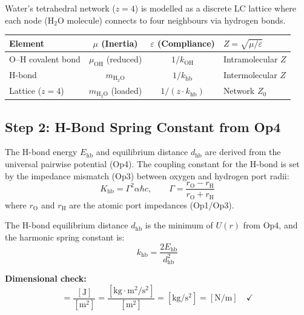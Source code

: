 Water's tetrahedral network ($z = 4$) is modelled as a discrete LC lattice 
where each node (H$_2$O molecule) connects to four neighbours via hydrogen bonds.

\begin{center}
\small
\renewcommand{\arraystretch}{1.2}
\begin{tabularx}{\textwidth}{@{}lccX@{}}
\toprule
\textbf{Element} & \textbf{$\mu$ (Inertia)} & \textbf{$\varepsilon$ (Compliance)} & \textbf{$Z = \sqrt{\mu/\varepsilon}$} \\
\midrule
O--H covalent bond & $\mu_\text{OH}$ (reduced) & $1/k_\text{OH}$ & Intramolecular $Z$ \\
H-bond             & $m_{\text{H}_2\text{O}}$ & $1/k_\text{hb}$ & Intermolecular $Z$ \\
Lattice ($z = 4$)  & $m_{\text{H}_2\text{O}}$ (loaded) & $1/(z \cdot k_\text{hb})$ & Network $Z_0$ \\
\bottomrule
\end{tabularx}
\end{center}

\subsection{Step 2: H-Bond Spring Constant from Op4}

The H-bond energy $E_\text{hb}$ and equilibrium distance $d_\text{hb}$ are derived 
from the universal pairwise potential (Op4). The coupling constant for the H-bond 
is set by the impedance mismatch (Op3) between oxygen and hydrogen port radii:
\begin{equation}
  K_\text{hb} = \Gamma^2 \alpha \hbar c, 
  \qquad \Gamma = \frac{r_\text{O} - r_\text{H}}{r_\text{O} + r_\text{H}}
  \label{eq:hb_coupling}
\end{equation}
where $r_\text{O}$ and $r_\text{H}$ are the atomic port impedances (Op1/Op3).

The H-bond equilibrium distance $d_\text{hb}$ is the minimum of $U(r)$ from Op4, 
and the harmonic spring constant is:
\begin{equation}
  k_\text{hb} = \frac{2 E_\text{hb}}{d_\text{hb}^2}
  \label{eq:k_hb}
\end{equation}

\noindent\textbf{Dimensional check:}
\begin{equation}
  [k_\text{hb}] = \frac{[\text{J}]}{[\text{m}^2]} 
  = \frac{[\text{kg}\cdot\text{m}^2/\text{s}^2]}{[\text{m}^2]} 
  = [\text{kg}/\text{s}^2] = [\text{N/m}] \quad\checkmark
\end{equation}

